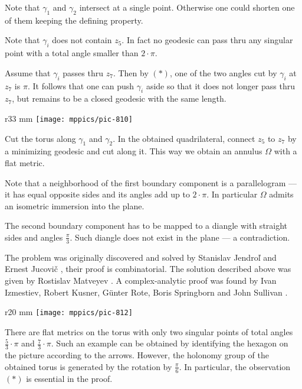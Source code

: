 Note that $\gamma_1$ and $\gamma_2$ intersect at a single point.
Otherwise one could shorten one of them keeping the defining property.

Note that $\gamma_i$ does not contain $z_5$.
In fact no geodesic can pass thru any singular point with a total angle smaller than $2\cdot\pi$.


Assume that $\gamma_i$ passes thru $z_7$.
Then by $({*})$, one of the two angles cut by $\gamma_i$ at $z_7$ is $\pi$.
It follows that one can push $\gamma_i$ aside so that it does not longer pass thru $z_7$, but remains to be a closed geodesic with the same length.

\begin{wrapfigure}{r}{33 mm}
\vskip0mm
\centering
\texttt{[image: mppics/pic-810]}
\end{wrapfigure}

Cut the torus along $\gamma_1$ and $\gamma_2$.
In the obtained quadrilateral, connect $z_5$ to $z_7$ by a minimizing geodesic and cut along it.
This way we obtain an annulus $\Omega$ with a flat metric.

Note that a neighborhood of the first boundary component is a parallelogram --- it has equal opposite sides and its angles add up to $2\cdot \pi$.
In particular $\Omega$ admits an isometric immersion into the plane.

The second boundary component has to be mapped to a diangle with straight sides and angles $\tfrac\pi3$.
Such diangle does not exist in the plane --- a contradiction.
\qeds

The problem was originally discovered and solved by {\selectfont Stanislav Jendro\v{l}}
and Ernest Jucovi\v{c} \cite{jendrol-jucovich},
their proof is combinatorial.
The solution described above was given by Rostislav Matveyev \cite{matveyev}.
A complex-analytic proof was found by 
Ivan Izmestiev, 
Robert Kusner, 
G\"unter Rote, 
Boris Springborn 
and John Sullivan \cite{izmestiev-rote-springborn-kusner}.

\begin{wrapfigure}{r}{20 mm}
\vskip0mm
\centering
\texttt{[image: mppics/pic-812]}
\end{wrapfigure}

There are flat metrics on the torus with 
only two singular points of total angles $\tfrac53\cdot\pi$ and $\tfrac73\cdot\pi$.
Such an example can be obtained by identifying the hexagon on the picture  according to the arrows.
However, the holonomy group of the obtained torus is generated by the rotation by $\tfrac\pi6$. 
In particular, the observation $({*})$ is essential in the proof.

